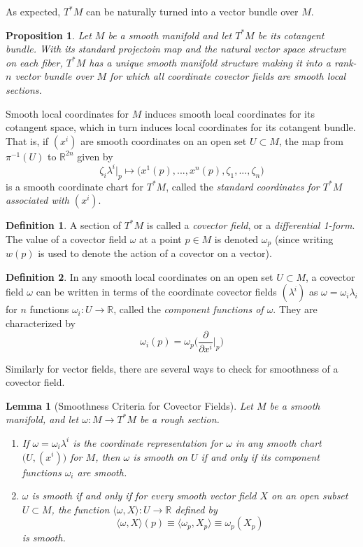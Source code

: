 \documentclass{article}
\newtheorem{proposition}[theorem]{Proposition}
\newtheorem{lemma}[theorem]{Lemma}
\theoremstyle{remark}
\theoremstyle{definition}
\newtheorem{definition}{Definition}[section]
\begin{document}
    As expected, $T^* M$ can be naturally turned into a vector bundle over $M$. 

    \begin{proposition}
    Let $M$ be a smooth manifold and let $T^* M$ be its cotangent bundle. With its standard projectoin map and the natural vector space structure on each fiber, $T^*M$ has a unique smooth manifold structure making it into a rank-$n$ vector bundle over $M$ for which all coordinate covector fields are smooth local sections. 
    \end{proposition}

    Smooth local coordinates for $M$ induces smooth local coordinates for its cotangent space, which in turn induces local coordinates for its cotangent bundle. That is, if $(x^i)$ are smooth coordinates on an open set $U \subset M$, the map from $\pi^{-1} (U)$ to $\mathbb{R}^{2n}$ given by 
    \[\zeta_i \lambda^i \big|_p \mapsto \big( x^1 (p), ..., x^n(p), \zeta_1, ..., \zeta_n \big) \]
    is a smooth coordinate chart for $T^* M$, called the \textit{standard coordinates for $T^* M$ associated with $(x^i)$}. 

    \begin{definition}
    A section of $T^* M$ is called a \textit{covector field}, or a \textit{differential 1-form}. The value of a covector field $\omega$ at a point $p \in M$ is denoted $\omega_p$ (since writing $w(p)$ is used to denote the action of a covector on a vector). 
    \end{definition}

    \begin{definition}
    In any smooth local coordinates on an open set $U \subset M$, a covector field $\omega$ can be written in terms of the coordinate covector fields $(\lambda^i)$ as $\omega = \omega_i \lambda_i$ for $n$ functions $\omega_i: U \longrightarrow \mathbb{R}$, called the \textit{component functions of $\omega$}. They are characterized by 
    \[\omega_i (p) = \omega_p \bigg( \frac{\partial}{\partial x^i} \bigg|_p \bigg)\]
    \end{definition}

    Similarly for vector fields, there are several ways to check for smoothness of a covector field. 

    \begin{lemma}[Smoothness Criteria for Covector Fields]
    Let $M$ be a smooth manifold, and let $\omega: M \longrightarrow T^* M$ be a rough section. 
    \begin{enumerate}
        \item If $\omega = \omega_i \lambda^i$ is the coordinate representation for $\omega$ in any smooth chart $\big(U, (x^i)\big)$ for $M$, then $\omega$ is smooth on $U$ if and only if its component functions $\omega_i$ are smooth. 
        \item $\omega$ is smooth if and only if for every smooth vector field $X$ on an open subset $U \subset M$, the function $\langle \omega, X \rangle: U \longrightarrow \mathbb{R}$ defined by 
        \[\langle \omega, X \rangle (p) \equiv \langle \omega_p, X_p \rangle \equiv \omega_p (X_p)\]
        is smooth. 
    \end{enumerate}
    \end{lemma}
\end{document}
